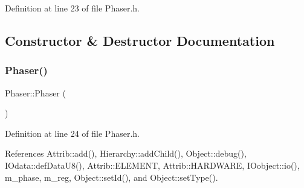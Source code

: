 Definition at line 23 of file Phaser.\+h.



\subsection{Constructor \& Destructor Documentation}
\mbox{\label{classPhaser_a849a7f7cd7d1491c490e4ba8e9906af0}} 
\subsubsection{\texorpdfstring{Phaser()}{Phaser()}}
{\footnotesize\ttfamily Phaser\+::\+Phaser (\begin{DoxyParamCaption}{ }\end{DoxyParamCaption})\hspace{0.3cm}{\ttfamily [inline]}}



Definition at line 24 of file Phaser.\+h.



References Attrib\+::add(), Hierarchy\+::add\+Child(), Object\+::debug(), I\+Odata\+::def\+Data\+U8(), Attrib\+::\+E\+L\+E\+M\+E\+NT, Attrib\+::\+H\+A\+R\+D\+W\+A\+RE, I\+Oobject\+::io(), m\+\_\+phase, m\+\_\+reg, Object\+::set\+Id(), and Object\+::set\+Type().


